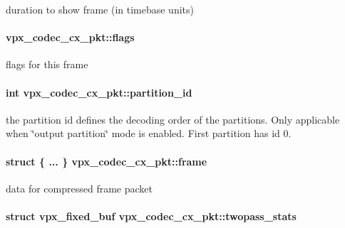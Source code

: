 duration to show frame (in timebase units) \hypertarget{structvpx__codec__cx__pkt_a3876fe0306342611465e9c15c6c4ae2f}{
\paragraph[{flags}]{ {\bf vpx\-\_\-codec\-\_\-cx\-\_\-pkt\-::flags}}}\label{structvpx__codec__cx__pkt_a3876fe0306342611465e9c15c6c4ae2f}
flags for this frame \hypertarget{structvpx__codec__cx__pkt_aaffee6af93af238ca7a145fb56c6d6f7}{
\paragraph[{partition\-\_\-id}]{\setlength{\rightskip}{0pt plus 5cm}int {\bf vpx\-\_\-codec\-\_\-cx\-\_\-pkt\-::partition\-\_\-id}}}\label{structvpx__codec__cx__pkt_aaffee6af93af238ca7a145fb56c6d6f7}
the partition id defines the decoding order of the partitions. \-Only applicable when \char`\"{}output partition\char`\"{} mode is enabled. \-First partition has id 0. \hypertarget{structvpx__codec__cx__pkt_a81e33bf4408a3983abb16492fee359ff}{
\paragraph[{frame}]{\setlength{\rightskip}{0pt plus 5cm}struct \{ ... \}   {\bf vpx\-\_\-codec\-\_\-cx\-\_\-pkt\-::frame}}}\label{structvpx__codec__cx__pkt_a81e33bf4408a3983abb16492fee359ff}
data for compressed frame packet \hypertarget{structvpx__codec__cx__pkt_a53db8576979fa7335e478eb849b256f1}{
\paragraph[{twopass\-\_\-stats}]{\setlength{\rightskip}{0pt plus 5cm}struct {\bf vpx\-\_\-fixed\-\_\-buf} {\bf vpx\-\_\-codec\-\_\-cx\-\_\-pkt\-::twopass\-\_\-stats}}}\label{structvpx__codec__cx__pkt_a53db8576979fa7335e478eb849b256f1}

